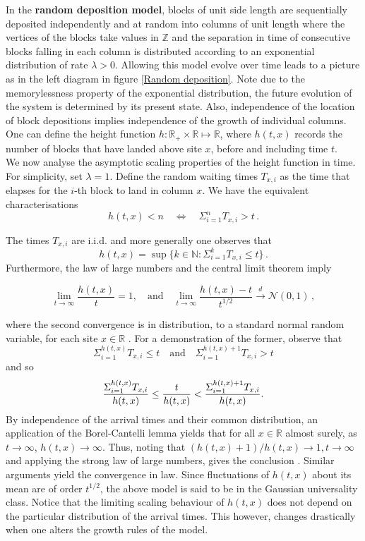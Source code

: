 \documentclass[12pt]{report}
\theoremstyle{plain}
\newcommand{\N}{\ensuremath{\mathbb{N}}}
\newcommand{\R}{\ensuremath{\mathbb{R}}}
\newcommand{\Z}{\ensuremath{\mathbb{Z}}}
\begin{document}
In the \textbf{random deposition model}, blocks of unit side length are sequentially deposited independently and at random into columns of unit length where the vertices of the blocks take values in \(\Z\) and the separation in time of consecutive blocks falling in each column is distributed according to an exponential distribution of rate \(\lambda >0\). Allowing this model evolve over time leads to a picture as in the left diagram in figure \ref{Random deposition}. Note due to the memorylessness property of the exponential distribution, the future evolution of the system is determined by its present state. Also, independence of the location of block depositions implies independence of the growth of individual columns. One can define the height function \(h:\R_{+}\times\R \mapsto \R\), where \(h(t,x)\) records the number of blocks that have landed above site \(x\), before and including time \(t\).\\

We now analyse the asymptotic scaling properties of the height function in time. For simplicity, set \(\lambda = 1\). Define the random waiting times \(T_{x,i}\) as the time that elapses for the \(i\)-th block to land in column \(x\). We have the equivalent characterisations
\[
h(t,x)<n \quad \iff \quad \displaystyle \Sigma_{i=1}^nT_{x,i}>t\,.
\]

\noindent The times \(T_{x,i}\) are i.i.d. and more generally one observes that
\[
h(t,x) = \sup \{k\in \N:  \displaystyle \Sigma_{i=1}^kT_{x,i}\leq t\}\,.
\]
\noindent Furthermore, the law of large numbers and the central limit theorem imply

\[
\displaystyle \lim_{t\to\infty}\frac{h(t,x)}{t} = 1, \quad \text{and} \quad \displaystyle \lim_{t\to\infty}\frac{h(t,x)-t}{t^{1/2}} \stackrel{d}{\rightarrow} \mathcal{N}(0,1)\,,
\]

\noindent where the second convergence is in distribution, to a standard normal random variable, for each site \(x\in \R\) \cite{corwin2016kardar}. For a demonstration of the former, observe that 
\[
\displaystyle\Sigma_{i=1}^{h(t,x)}T_{x,i}\leq t \quad \text{and} \quad \displaystyle \Sigma_{i=1}^{h(t,x)+1}T_{x,i}> t
\]
and so \[
\displaystyle\frac{\Sigma_{i=1}^{h(t,x)}T_{x,i}}{h(t,x)}\leq \frac{t}{h(t,x)} <\displaystyle \displaystyle\frac{\Sigma_{i=1}^{h(t,x)+1}T_{x,i}}{h(t,x)}.\]
By independence of the arrival times and their common distribution, an application of the Borel-Cantelli lemma yields that for all \(x\in\R\) almost surely, as \(t\to\infty\), \(h(t,x)\to \infty\). Thus, noting that \((h(t,x)+1)/h(t,x)\to 1, t \to \infty\) and applying the strong law of large numbers, gives the conclusion \cite{mitov2014renewal}. Similar arguments yield the convergence in law. Since fluctuations of \(h(t,x)\) about its mean are of order \(t^{1/2}\), the above model is said to be in the Gaussian universality class. Notice that the limiting scaling behaviour of \(h(t,x)\) does not depend on the particular distribution of the arrival times. This however, changes drastically when one alters the growth rules of the model.\\
\end{document}
